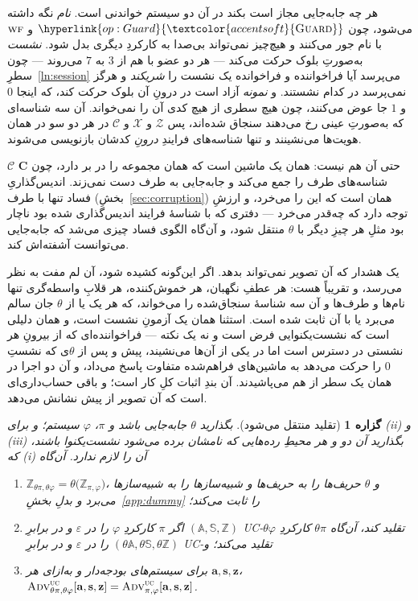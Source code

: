\documentclass[10pt,oneside,openany]{book}
\newcommand{\WF}{\op{wf}}
\newcommand{\Cs}{\mathbf{C}}
\newcommand{\Corr}{\mathcal{C}}
\newcommand{\Zenv}{\mathcal{Z}}
\newcommand{\bd}[1]{\mathbf{#1}}
\newcommand{\advtg}{\op{Adv}}
\newcommand{\Aset}{\mathbb{A}}
\newcommand{\SimSet}{\mathbb{S}}
\newcommand{\ZenvSet}{\mathbb{Z}}
\newcommand{\op}[1]{\textnormal{\textsc{#1}}}
\newcommand{\opl}[1]{\hyperlink{op:#1}{\textcolor{accentsoft}{\op{#1}}}}
\theoremstyle{accentdef}
\theoremstyle{accentplain}
\newtheorem{proposition}[definition]{گزاره}
\begin{document}
هر چه جابه‌جایی مجاز است بکند در آن دو سیستم خواندنی است. \emph{نام} نگه
داشته می‌شود، چون $\opl{Guard}$ و $\WF$ با نام جور می‌کنند و هیچ‌چیز
نمی‌تواند بی‌صدا به کارکردِ دیگری بدل شود. \emph{نشست} به‌صورتِ بلوک حرکت
می‌کند --- هر دو عضو با هم از $3$ به $7$ می‌روند --- چون
سطرِ~\ref{ln:session} می‌پرسد آیا فراخواننده و فراخوانده یک نشست را
\emph{شریکند} و هرگز نمی‌پرسد در کدام نشستند. و \emph{نمونه} آزاد است در
درونِ آن بلوک حرکت کند، که اینجا $0$ و $1$ جا عوض می‌کنند، چون هیچ سطری از
هیچ کدی آن را نمی‌خواند. آن سه شناسه‌ای که به‌صورتِ عینی رخ می‌دهند سنجاق
شده‌اند، پس $\Zenv$ و $\mathcal{X}$ و $\Corr$ در هر دو سو در همان هویت‌ها
می‌نشینند و تنها شناسه‌های فرایندِ \emph{درونِ} کدشان بازنویسی می‌شوند.

$\Corr$ حتی آن هم نیست: همان یک ماشین است که همان مجموعه را در بر دارد،
چون $\Cs$ شناسه‌های طرف را جمع می‌کند و جابه‌جایی به طرف دست نمی‌زند.
اندیس‌گذاریِ فساد تنها با طرف (بخشِ~\ref{sec:corruption}) همان است که این
را می‌خرد، و ارزشِ توجه دارد که چه‌قدر می‌خرد --- دفتری که با شناسهٔ فرایند
اندیس‌گذاری شده بود ناچار بود مثلِ هر چیزِ دیگر با $\theta$ منتقل شود، و
آن‌گاه الگوی فساد چیزی می‌شد که جابه‌جایی می‌توانست آشفته‌اش کند.

یک هشدار که آن تصویر نمی‌تواند بدهد. اگر این‌گونه کشیده شود، آن لم مفت به
نظر می‌رسد، و تقریباً هست: هر عطفِ نگهبان، هر خموش‌کننده، هر قلابِ
واسطه‌گری تنها نام‌ها و طرف‌ها و آن سه شناسهٔ سنجاق‌شده را می‌خواند، که هر
یک یا از $\theta$ جان سالم می‌برد یا با آن ثابت شده است. استثنا همان یک
آزمونِ نشست است، و همان دلیلی است که نشست‌یکنوایی فرض است و نه یک نکته ---
فراخواننده‌ای که از بیرونِ هر نشستی در دسترس است اما در یکی از آن‌ها
می‌نشیند، پیش و پس از $\theta$ی که نشستِ $0$ را حرکت می‌دهد به ماشین‌های
فراهم‌شده متفاوت پاسخ می‌داد، و آن دو اجرا در همان یک سطر از هم می‌پاشیدند.
آن بندِ اثبات کلِ کار است؛ و باقی حساب‌داری‌ای است که آن تصویر از پیش
نشانش می‌دهد.

\begin{proposition}[تقلید منتقل می‌شود]\label{prop:relocemul}
بگذارید $\theta$ جابه‌جایی باشد و $\pi$، $\varphi$ سیستم؛ و برای (ii) و
(iii) بگذارید آن دو و هر محیطِ رده‌هایی که نامشان برده می‌شود نشست‌یکنوا
باشند، که (i) آن را لازم ندارد. آن‌گاه
\begin{enumerate}[label=(\roman*),leftmargin=2.2em]
  \item $\ZenvSet_{\theta\pi,\theta\varphi} = \theta\bigl(\ZenvSet_{\pi,\varphi}\bigr)$، و
        $\theta$ حریف‌ها را به حریف‌ها و شبیه‌سازها را به شبیه‌سازها می‌برد و بدلِ
        بخشِ~\ref{app:dummy} را ثابت می‌کند؛
  \item اگر $\pi$ کارکردِ $\varphi$ را در $\varepsilon$ و در برابرِ
        $(\Aset,\SimSet,\ZenvSet)$ UC-تقلید کند، آن‌گاه $\theta\pi$ کارکردِ
        $\theta\varphi$ را در $\varepsilon$ و در برابرِ
        $(\theta\Aset,\theta\SimSet,\theta\ZenvSet)$ UC-تقلید می‌کند؛ و
  \item برای سیستم‌های بودجه‌دار و به‌ازای هر $\bd{a},\bd{s},\bd{z}$،
        $\advtg^{\op{uc}}_{\theta\pi,\theta\varphi}[\bd{a},\bd{s},\bd{z}]
         = \advtg^{\op{uc}}_{\pi,\varphi}[\bd{a},\bd{s},\bd{z}]$.
\end{enumerate}
\end{proposition}
\end{document}
